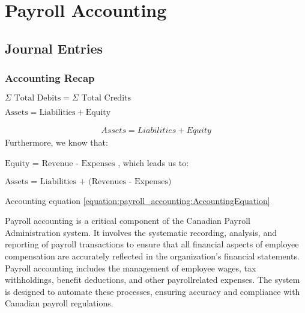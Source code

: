 \documentclass[letterpaper,10pt,english]{sphinxmanual}
\begin{document}
\sphinxstepscope


\chapter{Payroll Accounting}
\label{\detokenize{payroll_accounting:payroll-accounting}}\label{\detokenize{payroll_accounting::doc}}

\section{Journal Entries}
\label{\detokenize{payroll_accounting:journal-entries}}

\subsection{Accounting Recap}
\label{\detokenize{payroll_accounting:accounting-recap}}
\begin{center}\(\Sigma \text{ Total Debits} = \Sigma \text{ Total Credits}\)
\end{center}
\begin{center}\(\text{Assets} = \text{Liabilities} + \text{Equity}\)
\end{center}\begin{equation}\label{equation:payroll_accounting:AccountingEquation}
\begin{split}Assets = Liabilities + Equity\end{split}
\end{equation}
\sphinxAtStartPar
Furthermore, we know that:

\begin{center}\(\text{Equity = Revenue - Expenses}\)
, which leads us to:
\end{center}
\begin{center}\(\text{Assets = Liabilities + (Revenues - Expenses)}\)
\end{center}
\sphinxAtStartPar
Accounting equation \eqref{equation:payroll_accounting:AccountingEquation}

\sphinxAtStartPar
Payroll accounting is a critical component of the Canadian Payroll Administration system. It involves the systematic recording, analysis, and reporting of payroll transactions to ensure that all financial aspects of employee compensation are accurately reflected in the organization’s financial statements.
Payroll accounting includes the management of employee wages, tax withholdings, benefit deductions, and other payroll\sphinxhyphen{}related expenses. The system is designed to automate these processes, ensuring accuracy and compliance with Canadian payroll regulations.
\end{document}
